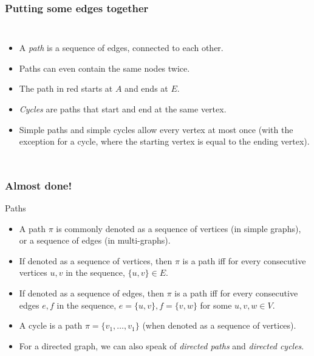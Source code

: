 \begin{frame}
	\frametitle{Putting some edges together}
	\begin{columns}
			
		\begin{itemize}
			\item A \textit{path} is a sequence of edges, connected to each other.
				\pause
			\item Paths can even contain the same nodes twice.
			\item The path in \alert{red} starts at $A$ and ends at $E$.
				\pause
			\item \textit{Cycles} are paths that start and end at the same vertex.
				\pause
			\item Simple paths and simple cycles allow every vertex at most once (with the exception for a cycle, where the
				starting vertex is equal to the ending vertex).
		\end{itemize}
	\end{columns}
\end{frame}

\begin{frame}
	\frametitle{Almost done!}
	\begin{block}{Paths}
		\begin{itemize}
			\item A path $\pi$ is commonly denoted as a sequence of vertices (in simple graphs), or a sequence of edges (in
				multi-graphs).
				\pause
			\item If denoted as a sequence of vertices, then $\pi$ is a path iff for every consecutive vertices $u,v$ in the
				sequence, $\{u,v\} \in E$.
				\pause
			\item If denoted as a sequence of edges, then $\pi$ is a path iff for every consecutive edges $e,f$ in the
				sequence, $e=\{u,v\}, f=\{v,w\}$ for some $u,v,w \in V$.
				\pause
			\item A cycle is a path $\pi = \{v_1, \dots, v_1\}$ (when denoted as a sequence of vertices).
				\pause
			\item For a directed graph, we can also speak of \textit{directed paths} and \textit{directed cycles}.
		\end{itemize}
	\end{block}	
\end{frame}

